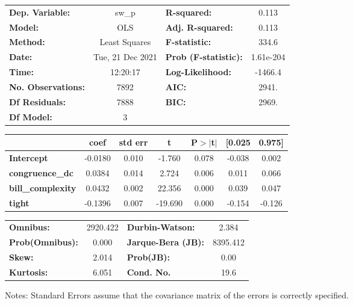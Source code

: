 \begin{center}
\begin{tabular}{lclc}
\toprule
\textbf{Dep. Variable:}    &      sw\_p       & \textbf{  R-squared:         } &     0.113   \\
\textbf{Model:}            &       OLS        & \textbf{  Adj. R-squared:    } &     0.113   \\
\textbf{Method:}           &  Least Squares   & \textbf{  F-statistic:       } &     334.6   \\
\textbf{Date:}             & Tue, 21 Dec 2021 & \textbf{  Prob (F-statistic):} & 1.61e-204   \\
\textbf{Time:}             &     12:20:17     & \textbf{  Log-Likelihood:    } &   -1466.4   \\
\textbf{No. Observations:} &        7892      & \textbf{  AIC:               } &     2941.   \\
\textbf{Df Residuals:}     &        7888      & \textbf{  BIC:               } &     2969.   \\
\textbf{Df Model:}         &           3      & \textbf{                     } &             \\
\bottomrule
\end{tabular}
\begin{tabular}{lcccccc}
                          & \textbf{coef} & \textbf{std err} & \textbf{t} & \textbf{P$> |$t$|$} & \textbf{[0.025} & \textbf{0.975]}  \\
\midrule
\textbf{Intercept}        &      -0.0180  &        0.010     &    -1.760  &         0.078        &       -0.038    &        0.002     \\
\textbf{congruence\_dc}   &       0.0384  &        0.014     &     2.724  &         0.006        &        0.011    &        0.066     \\
\textbf{bill\_complexity} &       0.0432  &        0.002     &    22.356  &         0.000        &        0.039    &        0.047     \\
\textbf{tight}            &      -0.1396  &        0.007     &   -19.690  &         0.000        &       -0.154    &       -0.126     \\
\bottomrule
\end{tabular}
\begin{tabular}{lclc}
\textbf{Omnibus:}       & 2920.422 & \textbf{  Durbin-Watson:     } &    2.384  \\
\textbf{Prob(Omnibus):} &   0.000  & \textbf{  Jarque-Bera (JB):  } & 8395.412  \\
\textbf{Skew:}          &   2.014  & \textbf{  Prob(JB):          } &     0.00  \\
\textbf{Kurtosis:}      &   6.051  & \textbf{  Cond. No.          } &     19.6  \\
\bottomrule
\end{tabular}
\end{center}

Notes: \newline
 [1] Standard Errors assume that the covariance matrix of the errors is correctly specified.